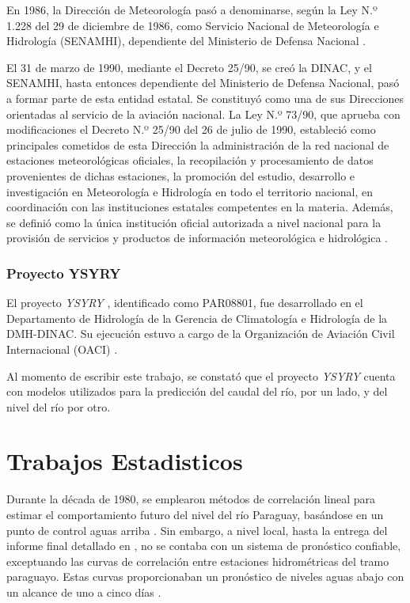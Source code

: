 En 1986, la Dirección de Meteorología pasó a denominarse, según la Ley N.º 1.228 del 29 de diciembre de 1986, como Servicio Nacional de Meteorología e Hidrología (SENAMHI), dependiente del Ministerio de Defensa Nacional \cite{DMH23b}.  

El 31 de marzo de 1990, mediante el Decreto 25/90, se creó la DINAC, y el SENAMHI, hasta entonces dependiente del Ministerio de Defensa Nacional, pasó a formar parte de esta entidad estatal. Se constituyó como una de sus Direcciones orientadas al servicio de la aviación nacional. La Ley N.º 73/90, que aprueba con modificaciones el Decreto N.º 25/90 del 26 de julio de 1990, estableció como principales cometidos de esta Dirección la administración de la red nacional de estaciones meteorológicas oficiales, la recopilación y procesamiento de datos provenientes de dichas estaciones, la promoción del estudio, desarrollo e investigación en Meteorología e Hidrología en todo el territorio nacional, en coordinación con las instituciones estatales competentes en la materia. Además, se definió como la única institución oficial autorizada a nivel nacional para la provisión de servicios y productos de información meteorológica e hidrológica \cite{DMH23b}.  

\subsubsection{Proyecto YSYRY}  

El proyecto \textit{YSYRY} \cite{ysyry-link}, identificado como PAR08801, fue desarrollado en el Departamento de Hidrología de la Gerencia de Climatología e Hidrología de la DMH-DINAC. Su ejecución estuvo a cargo de la Organización de Aviación Civil Internacional (OACI) \cite{ysyry-link}. 

Al momento de escribir este trabajo, se constató que el proyecto \textit{YSYRY} cuenta con modelos utilizados para la predicción del caudal del río, por un lado, y del nivel del río por otro.

\section{Trabajos Estadisticos}

Durante la década de 1980, se emplearon métodos de correlación lineal para estimar el comportamiento futuro del nivel del río Paraguay, basándose en un punto de control aguas arriba \cite{CON20}. Sin embargo, a nivel local, hasta la entrega del informe final detallado en \cite{CON20}, no se contaba con un sistema de pronóstico confiable, exceptuando las curvas de correlación entre estaciones hidrométricas del tramo paraguayo. Estas curvas proporcionaban un pronóstico de niveles aguas abajo con un alcance de uno a cinco días \cite{CON20}.

